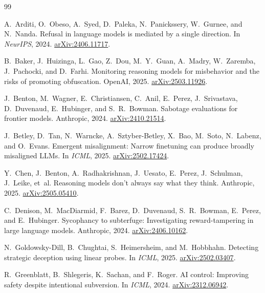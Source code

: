 \documentclass[10pt,twocolumn]{article}
\begin{document}
\small
\begin{thebibliography}{99}
\setlength{\itemsep}{1.5pt}

A.~Arditi, O.~Obeso, A.~Syed, D.~Paleka, N.~Panickssery, W.~Gurnee, and N.~Nanda.
\newblock Refusal in language models is mediated by a single direction.
\newblock In \emph{NeurIPS}, 2024. \href{https://arxiv.org/abs/2406.11717}{arXiv:2406.11717}.

B.~Baker, J.~Huizinga, L.~Gao, Z.~Dou, M.~Y.~Guan, A.~Madry, W.~Zaremba, J.~Pachocki, and D.~Farhi.
\newblock Monitoring reasoning models for misbehavior and the risks of promoting obfuscation.
\newblock OpenAI, 2025. \href{https://arxiv.org/abs/2503.11926}{arXiv:2503.11926}.

J.~Benton, M.~Wagner, E.~Christiansen, C.~Anil, E.~Perez, J.~Srivastava, D.~Duvenaud, E.~Hubinger, and S.~R.~Bowman.
\newblock Sabotage evaluations for frontier models.
\newblock Anthropic, 2024. \href{https://arxiv.org/abs/2410.21514}{arXiv:2410.21514}.

J.~Betley, D.~Tan, N.~Warncke, A.~Sztyber-Betley, X.~Bao, M.~Soto, N.~Labenz, and O.~Evans.
\newblock Emergent misalignment: Narrow finetuning can produce broadly misaligned LLMs.
\newblock In \emph{ICML}, 2025. \href{https://arxiv.org/abs/2502.17424}{arXiv:2502.17424}.

Y.~Chen, J.~Benton, A.~Radhakrishnan, J.~Uesato, E.~Perez, J.~Schulman, J.~Leike, et~al.
\newblock Reasoning models don't always say what they think.
\newblock Anthropic, 2025. \href{https://arxiv.org/abs/2505.05410}{arXiv:2505.05410}.

C.~Denison, M.~MacDiarmid, F.~Barez, D.~Duvenaud, S.~R.~Bowman, E.~Perez, and E.~Hubinger.
\newblock Sycophancy to subterfuge: Investigating reward-tampering in large language models.
\newblock Anthropic, 2024. \href{https://arxiv.org/abs/2406.10162}{arXiv:2406.10162}.

N.~Goldowsky-Dill, B.~Chughtai, S.~Heimersheim, and M.~Hobbhahn.
\newblock Detecting strategic deception using linear probes.
\newblock In \emph{ICML}, 2025. \href{https://arxiv.org/abs/2502.03407}{arXiv:2502.03407}.

R.~Greenblatt, B.~Shlegeris, K.~Sachan, and F.~Roger.
\newblock AI control: Improving safety despite intentional subversion.
\newblock In \emph{ICML}, 2024. \href{https://arxiv.org/abs/2312.06942}{arXiv:2312.06942}.


\end{thebibliography}
\end{document}

